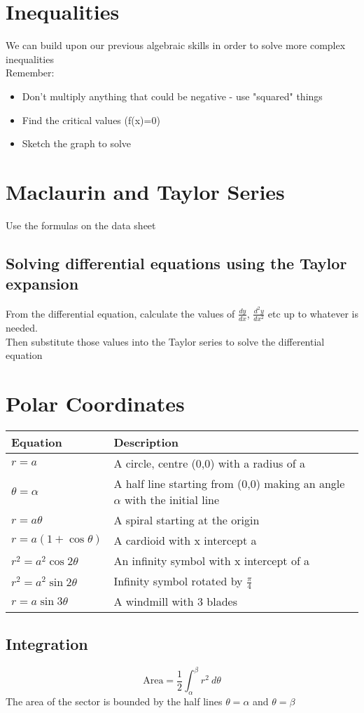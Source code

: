 \documentclass{article}[18pt]
\begin{document}
\section{Inequalities}
We can build upon our previous algebraic skills in order to solve more complex inequalities\\
Remember:
\begin{itemize}
\item Don't multiply anything that could be negative - use "squared" things
\item Find the critical values (f(x)=0)
\item Sketch the graph to solve
\end{itemize}
\section{Maclaurin and Taylor Series}
Use the formulas on the data sheet
\subsection{Solving differential equations using the Taylor expansion}
From the differential equation, calculate the values of $\frac{dy}{dx}$, $\frac{d^2y}{dx^2}$ etc up to whatever is needed.\\
Then substitute those values into the Taylor series to solve the differential equation
\section{Polar Coordinates}
\begin{tabularx}{\textwidth}{|X|X|}
\hline
Equation&Description\\
\hline
$r=a$&A circle, centre (0,0) with a radius of a\\
\hline
$\theta=\alpha$&A half line starting from (0,0) making an angle $\alpha$ with the initial line\\
\hline
$r=a\theta$&A spiral starting at the origin\\
\hline
$r=a(1+\cos\theta)$&A cardioid with x intercept a\\
\hline
$r^2=a^2\cos2\theta$&An infinity symbol with x intercept of a\\
\hline
$r^2=a^2\sin2\theta$&Infinity symbol rotated by $\frac{\pi}{4}$\\
\hline
$r=a\sin3\theta$&A windmill with 3 blades\\
\hline
\end{tabularx}
\newpage
\subsection{Integration}
$$\textrm{Area}=\frac{1}{2}\int_\alpha^\beta r^2 \ d\theta$$
The area of the sector is bounded by the half lines $\theta=\alpha$ and $\theta=\beta$
\end{document}
